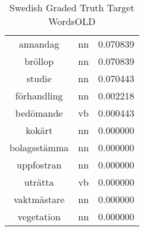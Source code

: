 \begin{table}[h]
\begin{tabular}{ccc}
annandag     & nn  & 0.070839         \\
bröllop      & nn  & 0.070839         \\
studie       & nn  & 0.070443         \\
förhandling  & nn  & 0.002218         \\
bedömande    & vb  & 0.000443         \\
kokärt       & nn  & 0.000000         \\
bolagsstämma & nn  & 0.000000         \\
uppfostran   & nn  & 0.000000         \\
uträtta      & vb  & 0.000000         \\
vaktmästare  & nn  & 0.000000         \\
vegetation   & nn  & 0.000000         \\
\bottomrule
\end{tabular}
\caption{Swedish Graded Truth Target WordsOLD}
\label{tab:sve-truthtargetsOLD}
\end{table}


